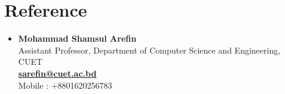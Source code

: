 \documentclass[letterpaper,11pt]{article}
\newcommand{\resumeSubHeadingListStart}{\begin{itemize}[leftmargin=*]}
\newcommand{\resumeSubHeadingListEnd}{\end{itemize}}
\begin{document}
%

\section{Reference}
 \resumeSubHeadingListStart
  \item  \textbf{Mohammad Shamsul Arefin} \\Assistant Professor, Department of Computer Science and Engineering, CUET\\
  \href{mailto:sarefin@cuet.ac.bd}{\textbf{sarefin@cuet.ac.bd}}  \\
  Mobile : +8801620256783 \\
   
 \resumeSubHeadingListEnd


\end{document}
